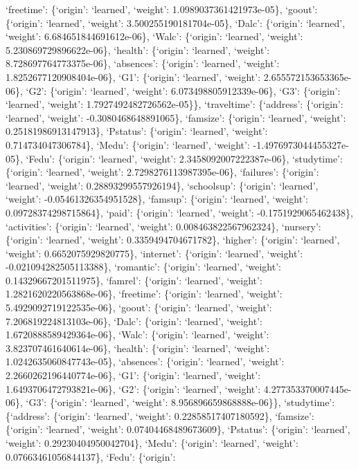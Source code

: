\documentclass[
]{article}
\begin{document}
`freetime': \{`origin': `learned', `weight': 1.0989037361421973e-05\},
`goout': \{`origin': `learned', `weight': 3.500255190181704e-05\},
`Dalc': \{`origin': `learned', `weight': 6.684651844691612e-06\},
`Walc': \{`origin': `learned', `weight': 5.230869729896622e-06\},
`health': \{`origin': `learned', `weight': 8.728697764773375e-06\},
`absences': \{`origin': `learned', `weight': 1.8252677120908404e-06\},
`G1': \{`origin': `learned', `weight': 2.655572153653365e-06\}, `G2':
\{`origin': `learned', `weight': 6.073498805912339e-06\}, `G3':
\{`origin': `learned', `weight': 1.7927492482726562e-05\}\},
`traveltime': \{`address': \{`origin': `learned', `weight':
-0.3080468648891065\}, `famsize': \{`origin': `learned', `weight':
0.25181986913147913\}, `Pstatus': \{`origin': `learned', `weight':
0.714734047306784\}, `Medu': \{`origin': `learned', `weight':
-1.4976973044455327e-05\}, `Fedu': \{`origin': `learned', `weight':
2.3458092007222387e-06\}, `studytime': \{`origin': `learned', `weight':
2.7298276113987395e-06\}, `failures': \{`origin': `learned', `weight':
0.28893299557926194\}, `schoolsup': \{`origin': `learned', `weight':
-0.05461326354951528\}, `famsup': \{`origin': `learned', `weight':
0.09728374298715864\}, `paid': \{`origin': `learned', `weight':
-0.1751929065462438\}, `activities': \{`origin': `learned', `weight':
0.008463822567962324\}, `nursery': \{`origin': `learned', `weight':
0.3359494704671782\}, `higher': \{`origin': `learned', `weight':
0.6652075929820775\}, `internet': \{`origin': `learned', `weight':
-0.021094282505113388\}, `romantic': \{`origin': `learned', `weight':
0.14329667201511975\}, `famrel': \{`origin': `learned', `weight':
1.2821620220563868e-06\}, `freetime': \{`origin': `learned', `weight':
5.4929092719122535e-06\}, `goout': \{`origin': `learned', `weight':
7.206819224813103e-06\}, `Dalc': \{`origin': `learned', `weight':
1.6720888589429364e-06\}, `Walc': \{`origin': `learned', `weight':
3.823707461640614e-06\}, `health': \{`origin': `learned', `weight':
1.0242635060847743e-05\}, `absences': \{`origin': `learned', `weight':
2.2660262196440774e-06\}, `G1': \{`origin': `learned', `weight':
1.6493706472793821e-06\}, `G2': \{`origin': `learned', `weight':
4.277353370007445e-06\}, `G3': \{`origin': `learned', `weight':
8.956896659868888e-06\}\}, `studytime': \{`address': \{`origin':
`learned', `weight': 0.22858517407180592\}, `famsize': \{`origin':
`learned', `weight': 0.07404468489673609\}, `Pstatus': \{`origin':
`learned', `weight': 0.29230404950042704\}, `Medu': \{`origin':
`learned', `weight': 0.07663461056844137\}, `Fedu': \{`origin':
\end{document}
